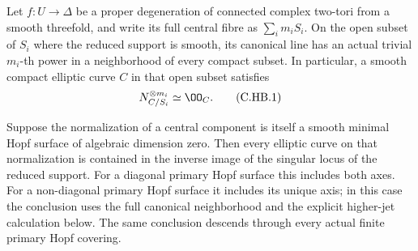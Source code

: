 
\begin{proposition}\label{cdp:st:C.2.UN.38}
Let $f:U\to\Delta$ be a proper degeneration of
connected complex two-tori from a smooth threefold,
and write its full central fibre as $\sum_i m_iS_i$.
On the open subset of $S_i$ where the reduced
support is smooth, its canonical line has an
actual trivial $m_i$-th power in a neighborhood
of every compact subset. In particular, a
smooth compact elliptic curve $C$ in that open
subset satisfies
\[
                         N_{C/S_i}^{\otimes m_i}
                                      \simeq\OO_C.    \tag{C.HB.1}\label{cdp:eq:C.HB.1}
\]

Suppose the normalization of a central component
is itself a smooth minimal Hopf surface of
algebraic dimension zero. Then every elliptic
curve on that normalization is contained in
the inverse image of the singular locus of
the reduced support. For a diagonal primary
Hopf surface this includes both axes. For a
non-diagonal primary Hopf surface it includes
its unique axis; in this case the conclusion
uses the full canonical neighborhood and
the explicit higher-jet calculation below.
The same conclusion descends through every
actual finite primary Hopf covering.
\end{proposition}

